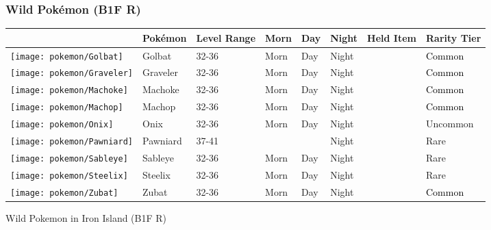 \subsubsection{Wild Pokémon (B1F R)}%
\label{ssubsec:WildPokmon(B1FR)}%
\begin{longtable}{||l l l l l l l l||}%
\hline%
\rowcolor{gray}%
&Pokémon&Level Range&Morn&Day&Night&Held Item&Rarity Tier\\%
\hline%
\endhead%
\hline%
\rowcolor{gray}%
\texttt{[image: pokemon/Golbat]}&Golbat&32{-}36&Morn&Day&Night&&\textcolor{black}{%
Common%
}\\%
\hline%
\rowcolor{gray}%
\texttt{[image: pokemon/Graveler]}&Graveler&32{-}36&Morn&Day&Night&&\textcolor{black}{%
Common%
}\\%
\hline%
\rowcolor{gray}%
\texttt{[image: pokemon/Machoke]}&Machoke&32{-}36&Morn&Day&Night&&\textcolor{black}{%
Common%
}\\%
\hline%
\rowcolor{gray}%
\texttt{[image: pokemon/Machop]}&Machop&32{-}36&Morn&Day&Night&&\textcolor{black}{%
Common%
}\\%
\hline%
\rowcolor{gray}%
\texttt{[image: pokemon/Onix]}&Onix&32{-}36&Morn&Day&Night&&\textcolor{OliveGreen}{%
Uncommon%
}\\%
\hline%
\rowcolor{gray}%
\texttt{[image: pokemon/Pawniard]}&Pawniard&37{-}41&&&Night&&\textcolor{RedOrange}{%
Rare%
}\\%
\hline%
\rowcolor{gray}%
\texttt{[image: pokemon/Sableye]}&Sableye&32{-}36&Morn&Day&Night&&\textcolor{RedOrange}{%
Rare%
}\\%
\hline%
\rowcolor{gray}%
\texttt{[image: pokemon/Steelix]}&Steelix&32{-}36&Morn&Day&Night&&\textcolor{RedOrange}{%
Rare%
}\\%
\hline%
\rowcolor{gray}%
\texttt{[image: pokemon/Zubat]}&Zubat&32{-}36&Morn&Day&Night&&\textcolor{black}{%
Common%
}\\%
\hline%
\end{longtable}%
\caption{Wild Pokemon in Iron Island (B1F R)}